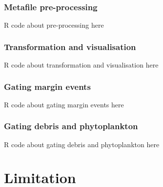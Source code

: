\documentclass[a4paper,12pt]{extarticle}
\begin{document}
 
 \subsubsection*{Metafile pre-processing}
 R code about pre-processing here
 \subsubsection*{Transformation and visualisation}
 R code about transformation and visualisation here
 \subsubsection*{Gating margin events}
 R code about gating margin events here
 \subsubsection*{Gating debris and phytoplankton}
 R code about gating debris and phytoplankton here
 
 \section*{Limitation}
 
\end{document}
